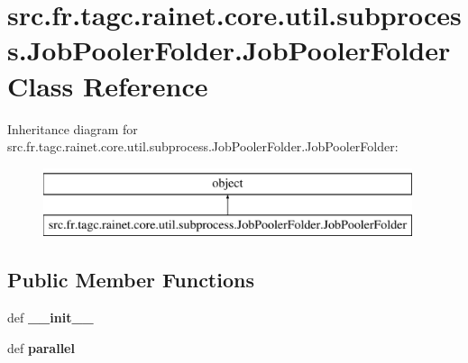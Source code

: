 \hypertarget{classsrc_1_1fr_1_1tagc_1_1rainet_1_1core_1_1util_1_1subprocess_1_1JobPoolerFolder_1_1JobPoolerFolder}{\section{src.\-fr.\-tagc.\-rainet.\-core.\-util.\-subprocess.\-Job\-Pooler\-Folder.\-Job\-Pooler\-Folder Class Reference}
\label{classsrc_1_1fr_1_1tagc_1_1rainet_1_1core_1_1util_1_1subprocess_1_1JobPoolerFolder_1_1JobPoolerFolder}
}
Inheritance diagram for src.\-fr.\-tagc.\-rainet.\-core.\-util.\-subprocess.\-Job\-Pooler\-Folder.\-Job\-Pooler\-Folder\-:\begin{figure}[H]
\begin{center}
\leavevmode
\includegraphics[height=2.000000cm]{classsrc_1_1fr_1_1tagc_1_1rainet_1_1core_1_1util_1_1subprocess_1_1JobPoolerFolder_1_1JobPoolerFolder}
\end{center}
\end{figure}
\subsection*{Public Member Functions}
\begin{DoxyCompactItemize}
\item 
\hypertarget{classsrc_1_1fr_1_1tagc_1_1rainet_1_1core_1_1util_1_1subprocess_1_1JobPoolerFolder_1_1JobPoolerFolder_a94d3a43af26d648489605ab7a05e9602}{def {\bfseries \-\_\-\-\_\-init\-\_\-\-\_\-}}\label{classsrc_1_1fr_1_1tagc_1_1rainet_1_1core_1_1util_1_1subprocess_1_1JobPoolerFolder_1_1JobPoolerFolder_a94d3a43af26d648489605ab7a05e9602}

\item 
\hypertarget{classsrc_1_1fr_1_1tagc_1_1rainet_1_1core_1_1util_1_1subprocess_1_1JobPoolerFolder_1_1JobPoolerFolder_ad31bdc5a80a8e6fb33c3e9c33c9b0564}{def {\bfseries parallel}}\label{classsrc_1_1fr_1_1tagc_1_1rainet_1_1core_1_1util_1_1subprocess_1_1JobPoolerFolder_1_1JobPoolerFolder_ad31bdc5a80a8e6fb33c3e9c33c9b0564}

\end{DoxyCompactItemize}
